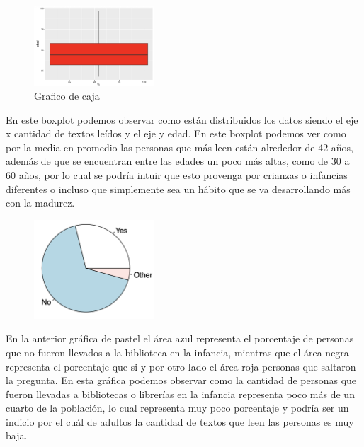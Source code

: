 \documentclass[aps,reprint]{revtex4-2}
\begin{document}
\begin{figure}[H]
    \centering
    \includegraphics[width=0.4\textwidth]{Screenshot 2025-10-10 at 15.21.24.png}
    \caption{Grafico de caja}
    \label{fig:caja}
    
\end{figure}

En este boxplot podemos observar como están distribuidos los datos siendo el eje x cantidad
de textos leídos y el eje y edad. En este boxplot podemos ver como por la media en promedio
las personas que más leen están alrededor de 42 años, además de que se encuentran entre las
edades un poco más altas, como de 30 a 60 años, por lo cual se podría intuir que esto provenga
por crianzas o infancias diferentes o incluso que simplemente sea un hábito que se va
desarrollando más con la madurez.

\begin{figure}[H]
    \centering
    \includegraphics[width=0.4\textwidth]{Screenshot 2025-10-10 at 15.23.46.png}
    \caption{}
    \label{fig:pie}
    
\end{figure}

En la anterior gráfica de pastel el área azul representa el porcentaje de personas que no fueron
llevados a la biblioteca en la infancia, mientras que el área negra representa el porcentaje que
si y por otro lado el área roja personas que saltaron la pregunta. En esta gráfica podemos
observar como la cantidad de personas que fueron llevadas a bibliotecas o librerías en la
infancia representa poco más de un cuarto de la población, lo cual representa muy poco
porcentaje y podría ser un indicio por el cuál de adultos la cantidad de textos que leen las
personas es muy baja.
\end{document}
